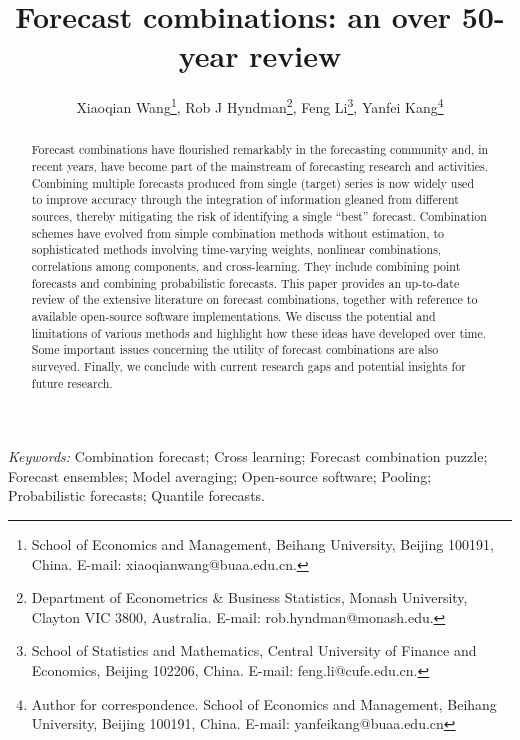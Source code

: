 \documentclass[a4paper,11pt]{article}
\begin{document}
\def\spacingset#1{\renewcommand{\baselinestretch}%
  {#1}\small\normalsize} \spacingset{1.25}

\title{\bf
  Forecast combinations: an over 50-year review
}

\author{Xiaoqian Wang\footnote{School of Economics and Management, Beihang University,
    Beijing 100191, China. E-mail: xiaoqianwang@buaa.edu.cn.},\quad
  Rob J Hyndman\footnote{Department of Econometrics \& Business Statistics, Monash University,
    Clayton VIC 3800, Australia. E-mail: rob.hyndman@monash.edu.},\quad
  Feng Li\footnote{School of Statistics and Mathematics, Central University of Finance and Economics,
    Beijing 102206, China. E-mail: feng.li@cufe.edu.cn.},\quad
  Yanfei Kang\footnote{Author for correspondence. School of Economics and Management, Beihang University,
    Beijing 100191, China. E-mail: yanfeikang@buaa.edu.cn}}

\maketitle

\bigskip
\begin{abstract}
  Forecast combinations have flourished remarkably in the forecasting community and, in recent years, have become part of the mainstream of forecasting research and activities. Combining multiple forecasts produced from single (target) series is now widely used to improve accuracy through the integration of information gleaned from different sources, thereby mitigating the risk of identifying a single ``best'' forecast. Combination schemes have evolved from simple combination methods without estimation, to sophisticated methods involving time-varying weights, nonlinear combinations, correlations among components, and cross-learning. They include combining point forecasts and combining probabilistic forecasts. This paper provides an up-to-date review of the extensive literature on forecast combinations, together with reference to available open-source software implementations. We discuss the potential and limitations of various methods and highlight how these ideas have developed over time. Some important issues concerning the utility of forecast combinations are also surveyed. Finally, we conclude with current research gaps and potential insights for future research.
\end{abstract}

\noindent%
\textit{Keywords:}
  Combination forecast;
  Cross learning;
  Forecast combination puzzle;
  Forecast ensembles;
  Model averaging;
  Open-source software;
  Pooling;
  Probabilistic forecasts;
  Quantile forecasts.
\vfill
\end{document}
